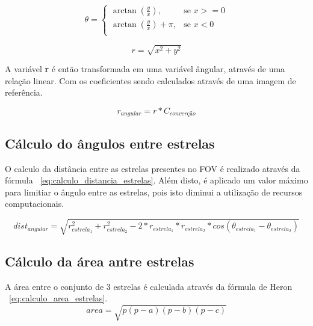 \begin{equation}
	\theta  = 
	\begin{cases}
		\arctan \left( \frac{y}{x} \right), & \text{se } x >= 0 \\
		\arctan \left( \frac{y}{x} \right) + \pi, & \text{se } x < 0 \\
	\end{cases}
	\label{eq:transformacao_cordenadas_theta}
\end{equation}

\begin{equation}
	r = \sqrt{x^2 + y^2}
	\label{eq:transformacao_cordenadas_r}
\end{equation}

A variável \textbf{r} é então transformada em uma variável ângular, através de uma relação linear. Com os coeficientes sendo calculados através de uma imagem de referência.

\begin{equation}
	r_{angular} = r * C_{converção}
	\label{eq:transformacao_cordenadas_theta_angular}
\end{equation}

\subsection{Cálculo do ângulos entre estrelas}
O calculo da distância entre as estrelas presentes no FOV é realizado através da fórmula ~\ref{eq:calculo_distancia_estrelas}.
Além disto, é aplicado um valor máximo para limitiar o ângulo entre as estrelas, pois isto diminui a utilização de recursos computacionais.

\begin{equation}
	dist_{angular} = \sqrt{r_{estrela_1}^2 + r_{estrela_2}^2 - 2 * r_{estrela_1} * r_{estrela_2} * cos(\theta_{estrela_1} - \theta_{estrela_2})}
	\label{eq:calculo_distancia_estrelas}
\end{equation}

\subsection{Cálculo da área antre estrelas}

A área entre o conjunto de 3 estrelas é calculada através da fórmula de Heron ~\ref{eq:calculo_area_estrelas}.
\begin{equation}
	area = \sqrt{p(p-a)(p-b)(p-c)}
	\label{eq:calculo_area_estrelas}
\end{equation}

